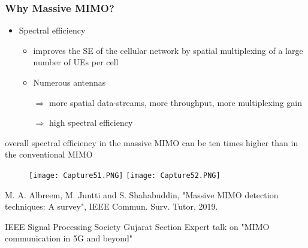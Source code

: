 \documentclass{beamer}
\begin{document}
\begin{frame}[fragile=singleslide]\frametitle{Why Massive MIMO?}
\begin{itemize}
\item Spectral efficiency
\begin{itemize}
\item \scriptsize improves the SE of the cellular network by spatial multiplexing of a large number of UEs per cell


\item Numerous antennas


$\Rightarrow$ \scriptsize more spatial data-streams, more throughput, more multiplexing gain


$\Rightarrow$ high spectral efficiency
\end{itemize}
\end{itemize}
overall spectral efficiency in the massive MIMO can be ten times higher than in the conventional MIMO

\begin{figure}
  \texttt{[image: Capture51.PNG]}
  \texttt{[image: Capture52.PNG]}
\end{figure}

\tiny M. A. Albreem, M. Juntti and S. Shahabuddin, "Massive MIMO detection techniques: A survey", IEEE Commun. Surv. Tutor, 2019.

\tiny  IEEE Signal Processing Society Gujarat Section Expert talk on "MIMO communication in 5G and beyond"
\end{frame}






\end{document}
